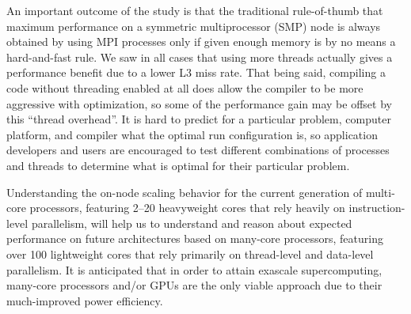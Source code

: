 \documentclass{mc2015}
\begin{document}
An important outcome of the study is that the traditional rule-of-thumb that
maximum performance on a symmetric multiprocessor (SMP) node is always obtained
by using MPI processes only if given enough memory is by no means a
hard-and-fast rule. We saw in all cases that using more threads actually gives
a performance benefit due to a lower L3 miss rate. That being said, compiling a
code without threading enabled at all does allow the compiler to be more
aggressive with optimization, so some of the performance gain may be offset by
this ``thread overhead''. It is hard to predict for a particular problem,
computer platform, and compiler what the optimal run configuration is, so
application developers and users are encouraged to test different combinations
of processes and threads to determine what is optimal for their particular
problem.

Understanding the on-node scaling behavior for the current generation of
multi-core processors, featuring 2--20 heavyweight cores that rely heavily on
instruction-level parallelism, will help us to understand and reason about
expected performance on future architectures based on many-core processors,
featuring over 100 lightweight cores that rely primarily on thread-level and
data-level parallelism. It is anticipated that in order to attain exascale
supercomputing, many-core processors and/or GPUs are the only viable approach
due to their much-improved power efficiency.

\setlength{\baselineskip}{12pt}



\end{document}
